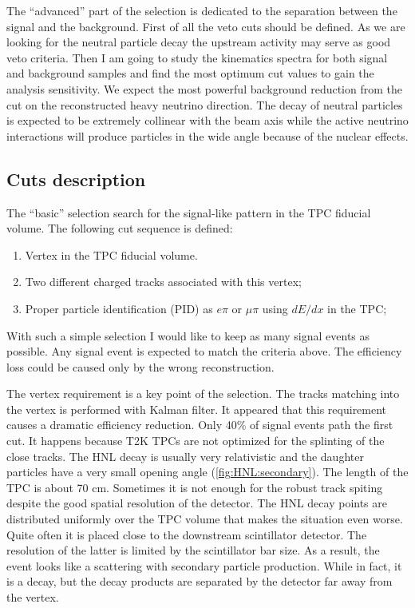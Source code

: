 \documentclass[../main.tex]{subfiles}
\begin{document}
The ``advanced'' part of the selection is dedicated to the separation between the signal and the background. First of all the veto cuts should be defined. As we are looking for the neutral particle decay the upstream activity may serve as good veto criteria. Then I am going to study the kinematics spectra for both signal and background samples and find the most optimum cut values to gain the analysis sensitivity. We expect the most powerful background reduction from the cut on the reconstructed heavy neutrino direction. The decay of neutral particles is expected to be extremely collinear with the beam axis while the active neutrino interactions will produce particles in the wide angle because of the nuclear effects.

\subsection{Cuts description}
The ``basic'' selection search for the signal-like pattern in the TPC fiducial volume. The following cut sequence is defined:

\begin{enumerate}
  \item Vertex in the TPC fiducial volume.
  \item Two different charged tracks associated with this vertex;
  \item Proper particle identification (PID) as $e\pi$ or $\mu \pi$ using $dE/dx$ in the TPC;
\end{enumerate}

With such a simple selection I would like to keep as many signal events as possible. Any signal event is expected to match the criteria above. The efficiency loss could be caused only by the wrong reconstruction.

The vertex requirement is a key point of the selection. The tracks matching into the vertex is performed with Kalman filter. It appeared that this requirement causes a dramatic efficiency reduction. Only 40\% of signal events path the first cut. It happens because T2K TPCs are not optimized for the splinting of the close tracks. The HNL decay is usually very relativistic and the daughter particles have a very small opening angle (\autoref{fig:HNL:secondary}). The length of the TPC is about 70 cm. Sometimes it is not enough for the robust track spiting despite the good spatial resolution of the detector. The HNL decay points are distributed uniformly over the TPC volume that makes the situation even worse. Quite often it is placed close to the downstream scintillator detector. The resolution of the latter is limited by the scintillator bar size. As a result, the event looks like a scattering with secondary particle production. While in fact, it is a decay, but the decay products are separated by the detector far away from the vertex.
\end{document}
